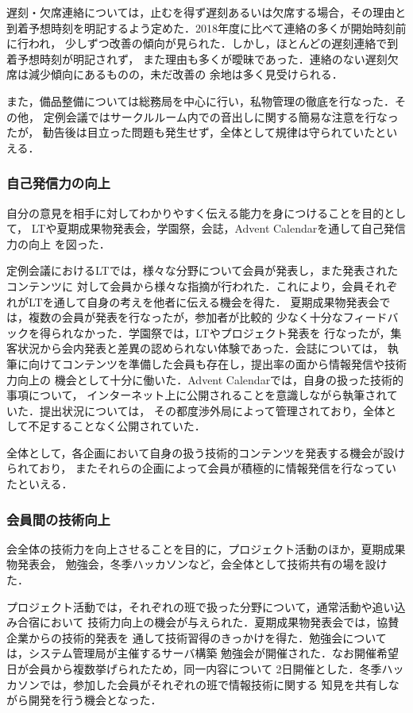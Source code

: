 遅刻・欠席連絡については，止むを得ず遅刻あるいは欠席する場合，その理由と
到着予想時刻を明記するよう定めた．2018年度に比べて連絡の多くが開始時刻前に行われ，
少しずつ改善の傾向が見られた．しかし，ほとんどの遅刻連絡で到着予想時刻が明記されず，
また理由も多くが曖昧であった．連絡のない遅刻欠席は減少傾向にあるものの，未だ改善の
余地は多く見受けられる．

また，備品整備については総務局を中心に行い，私物管理の徹底を行なった．その他，
定例会議ではサークルルーム内での音出しに関する簡易な注意を行なったが，
勧告後は目立った問題も発生せず，全体として規律は守られていたといえる．

\subsubsection*{自己発信力の向上}
自分の意見を相手に対してわかりやすく伝える能力を身につけることを目的として，
LTや夏期成果物発表会，学園祭，会誌，Advent Calendarを通して自己発信力の向上
を図った．

定例会議におけるLTでは，様々な分野について会員が発表し，また発表されたコンテンツに
対して会員から様々な指摘が行われた．これにより，会員それぞれがLTを通して自身の考えを他者に伝える機会を得た．
夏期成果物発表会では，複数の会員が発表を行なったが，参加者が比較的
少なく十分なフィードバックを得られなかった．学園祭では，LTやプロジェクト発表を
行なったが，集客状況から会内発表と差異の認められない体験であった．会誌については，
執筆に向けてコンテンツを準備した会員も存在し，提出率の面から情報発信や技術力向上の
機会として十分に働いた．Advent Calendarでは，自身の扱った技術的事項について，
インターネット上に公開されることを意識しながら執筆されていた．提出状況については，
その都度渉外局によって管理されており，全体として不足することなく公開されていた．

全体として，各企画において自身の扱う技術的コンテンツを発表する機会が設けられており，
またそれらの企画によって会員が積極的に情報発信を行なっていたといえる．

\subsubsection*{会員間の技術向上}
会全体の技術力を向上させることを目的に，プロジェクト活動のほか，夏期成果物発表会，
勉強会，冬季ハッカソンなど，会全体として技術共有の場を設けた．

プロジェクト活動では，それぞれの班で扱った分野について，通常活動や追い込み合宿において
技術力向上の機会が与えられた．夏期成果物発表会では，協賛企業からの技術的発表を
通して技術習得のきっかけを得た．勉強会については，システム管理局が主催するサーバ構築
勉強会が開催された．なお開催希望日が会員から複数挙げられたため，同一内容について
2日開催とした．冬季ハッカソンでは，参加した会員がそれぞれの班で情報技術に関する
知見を共有しながら開発を行う機会となった．

